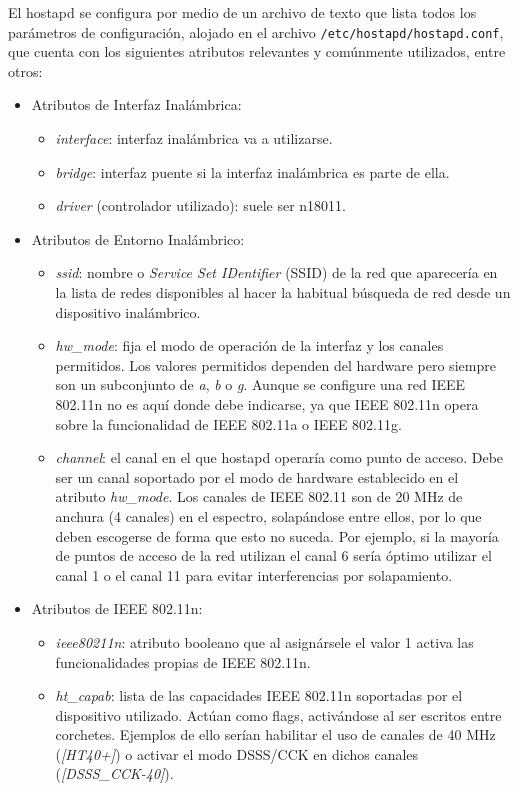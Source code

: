 El hostapd se configura por medio de un archivo de texto que lista todos los parámetros de configuración, alojado en el archivo \verb+/etc/hostapd/hostapd.conf+, que cuenta con los siguientes atributos relevantes y comúnmente utilizados, entre otros:
\begin{itemize}
\item Atributos de Interfaz Inalámbrica:
\begin{itemize}
\item \emph{interface}: interfaz inalámbrica va a utilizarse.
\item \emph{bridge}: interfaz puente si la interfaz inalámbrica es parte de ella.
\item \emph{driver} (controlador utilizado): suele ser n18011.
\end{itemize}
\item Atributos de Entorno Inalámbrico:
\begin{itemize}
\item \emph{ssid}: nombre o \emph{Service Set IDentifier} (\acrshort{SSID}) de la red que aparecería en la lista de redes disponibles al hacer la habitual búsqueda de red desde un dispositivo inalámbrico.
\item \emph{hw\_mode}: fija el modo de operación de la interfaz y los canales permitidos. Los valores permitidos dependen del hardware pero siempre son un subconjunto de \emph{a}, \emph{b} o \emph{g}. Aunque se configure una red \acrshort{IEEE} 802.11n no es aquí donde debe indicarse, ya que \acrshort{IEEE} 802.11n opera sobre la funcionalidad de \acrshort{IEEE} 802.11a o \acrshort{IEEE} 802.11g.
\item \emph{channel}: el canal en el que hostapd operaría como punto de acceso. Debe ser un canal soportado por el modo de hardware establecido en el atributo \emph{hw\_mode}. Los canales de \acrshort{IEEE} 802.11 son de 20 MHz de anchura (4 canales) en el espectro, solapándose entre ellos, por lo que deben escogerse de forma que esto no suceda. Por ejemplo, si la mayoría de puntos de acceso de la red utilizan el canal 6 sería óptimo utilizar el canal 1 o el canal 11 para evitar interferencias por solapamiento.
\end{itemize}
\item Atributos de \acrshort{IEEE} 802.11n:
\begin{itemize}
\item \emph{ieee80211n}: atributo booleano que al asignársele el valor 1 activa las funcionalidades propias de \acrshort{IEEE} 802.11n.
\item \emph{ht\_capab}: lista de las capacidades \acrshort{IEEE} 802.11n soportadas por el dispositivo utilizado. Actúan como flags, activándose al ser escritos entre corchetes. Ejemplos de ello serían habilitar el uso de canales de 40 MHz (\emph{[HT40+]}) o activar el modo \acrshort{DSSS}/\acrshort{CCK} en dichos canales (\emph{[DSSS\_CCK-40]}).

\end{itemize}
\end{itemize}
